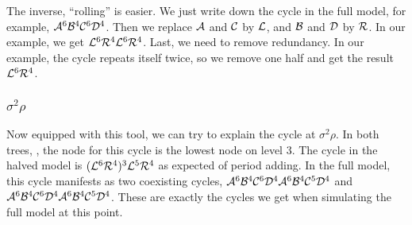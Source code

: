 The inverse, ``rolling'' is easier.
We just write down the cycle in the full model, for example, $\mathcal{A}^6\mathcal{B}^4\mathcal{C}^6\mathcal{D}^4$.
Then we replace $\mathcal{A}$ and $\mathcal{C}$ by $\mathcal{L}$, and $\mathcal{B}$ and $\mathcal{D}$ by $\mathcal{R}$.
In our example, we get $\mathcal{L}^6\mathcal{R}^4\mathcal{L}^6\mathcal{R}^4$.
Last, we need to remove redundancy.
In our example, the cycle repeats itself twice, so we remove one half and get the result $\mathcal{L}^6\mathcal{R}^4$.

\subsubsection{$\sigma^2\rho$}

Now equipped with this tool, we can try to explain the cycle at $\sigma^2\rho$.
In both trees, , the node for this cycle is the lowest node on level 3.
The cycle in the halved model is $(\mathcal{L}^6\mathcal{R}^4)^3\mathcal{L}^5\mathcal{R}^4$ as expected of period adding.
In the full model, this cycle manifests as two coexisting cycles, $\mathcal{A}^6\mathcal{B}^4\mathcal{C}^6\mathcal{D}^4\mathcal{A}^6\mathcal{B}^4\mathcal{C}^5\mathcal{D}^4$ and $\mathcal{A}^6\mathcal{B}^4\mathcal{C}^6\mathcal{D}^4\mathcal{A}^6\mathcal{B}^4\mathcal{C}^5\mathcal{D}^4$.
These are exactly the cycles we get when simulating the full model at this point.
